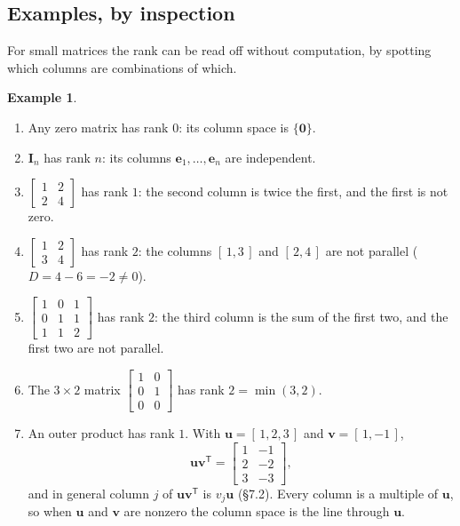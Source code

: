 \documentclass[11pt]{article}
\theoremstyle{plain}
\theoremstyle{definition}
\newtheorem{ex}{Example}[section]
\theoremstyle{remark}
\newcommand{\vc}[1]{\mathbf{#1}}        %
\newcommand{\mt}[1]{\mathbf{#1}}        %
\newcommand{\T}{^{\mathsf{T}}}          %
\begin{document}
\subsection{Examples, by inspection}
For small matrices the rank can be read off without computation, by spotting
which columns are combinations of which.

\begin{ex}
\label{ex:ranks}
\leavevmode
\begin{enumerate}[label=(\alph*),leftmargin=2em,itemsep=3pt]
  \item Any zero matrix has rank $0$: its column space is $\{\vc{0}\}$.
  \item $\mt{I}_n$ has rank $n$: its columns $\vc{e}_1,\dots,\vc{e}_n$ are
        independent.
  \item $\begin{bmatrix}1&2\\2&4\end{bmatrix}$ has rank $1$: the second column
        is twice the first, and the first is not zero.
  \item $\begin{bmatrix}1&2\\3&4\end{bmatrix}$ has rank $2$: the columns
        $[\,1,3\,]$ and $[\,2,4\,]$ are not parallel ($D=4-6=-2\neq0$).
  \item $\begin{bmatrix}1&0&1\\0&1&1\\1&1&2\end{bmatrix}$ has rank $2$: the
        third column is the sum of the first two, and the first two are not
        parallel.
  \item The $3\times2$ matrix
        $\begin{bmatrix}1&0\\0&1\\0&0\end{bmatrix}$ has rank $2=\min(3,2)$.
  \item An outer product has rank $1$. With $\vc{u}=[\,1,2,3\,]$ and
        $\vc{v}=[\,1,-1\,]$,
        \[
          \vc{u}\vc{v}\T=
          \begin{bmatrix}1&-1\\2&-2\\3&-3\end{bmatrix},
        \]
        and in general column $j$ of $\vc{u}\vc{v}\T$ is $v_j\vc{u}$ (\S7.2).
        Every column is a multiple of $\vc{u}$, so when $\vc{u}$ and $\vc{v}$
        are nonzero the column space is the line through $\vc{u}$.
\end{enumerate}
\end{ex}
\end{document}
